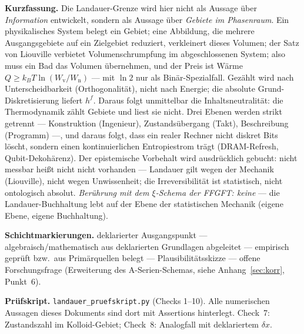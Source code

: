 



\begingroup\small\noindent
\textbf{Kurzfassung.} Die Landauer-Grenze wird hier nicht als Aussage über
\emph{Information} entwickelt, sondern als Aussage über \emph{Gebiete im
Phasenraum}. Ein physikalisches System belegt ein Gebiet; eine Abbildung, die
mehrere Ausgangsgebiete auf ein Zielgebiet reduziert, verkleinert dieses
Volumen; der Satz von Liouville verbietet Volumenschrumpfung im abgeschlossenen
System; also muss ein Bad das Volumen übernehmen, und der Preis ist Wärme
$Q \ge k_B T \ln(W_{\text{v}}/W_{\text{n}})$ --- mit $\ln 2$ nur als
Binär-Spezialfall. Gezählt wird nach Unterscheidbarkeit (Orthogonalität), nicht
nach Energie; die absolute Grund-Diskretisierung liefert $h^f$. Daraus folgt
unmittelbar die Inhaltsneutralität: die Thermodynamik zählt Gebiete und liest
sie nicht. Drei Ebenen werden strikt getrennt --- Konstruktion (Ingenieur),
Zustandsübergang (Takt), Beschreibung (Programm) ---, und daraus folgt, dass ein
realer Rechner nicht diskret Bits löscht, sondern einen kontinuierlichen
Entropiestrom trägt (DRAM-Refresh, Qubit-Dekohärenz). Der epistemische Vorbehalt
wird ausdrücklich gebucht: nicht messbar heißt nicht nicht vorhanden --- Landauer
gilt wegen der Mechanik (Liouville), nicht wegen Unwissenheit; die
Irreversibilität ist statistisch, nicht ontologisch absolut. \emph{Berührung mit
dem $\xi$-Schema der FFGFT: keine} --- die Landauer-Buchhaltung lebt auf der
Ebene der statistischen Mechanik (eigene Ebene, eigene Buchhaltung).
\par\endgroup

\bigskip

\begingroup\small\noindent
\textbf{Schichtmarkierungen.} \LS deklarierter Ausgangspunkt ---
\LB algebraisch/mathematisch aus deklarierten Grundlagen abgeleitet ---
\LK empirisch geprüft bzw.\ aus Primärquellen belegt ---
\LSk Plausibilitätsskizze ---
\LH offene Forschungsfrage (Erweiterung des A-Serien-Schemas, siehe
Anhang~\ref{sec:korr}, Punkt~6).
\par\endgroup

\bigskip

\begingroup\small\noindent
\textbf{Prüfskript.} \texttt{landauer\_pruefskript.py} (Checks 1--10). Alle
numerischen Aussagen dieses Dokuments sind dort mit Assertions hinterlegt.
Check~7: Zustandszahl im Kolloid-Gebiet; Check~8: Analogfall mit deklariertem
$\delta x$.
\par\endgroup

